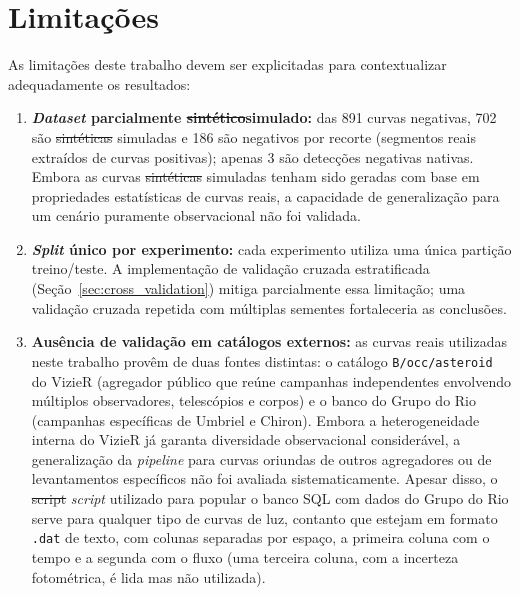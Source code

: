 \documentclass[msc]{on} %
\makeatletter
\providecommand{\DIFaddtex}[1]{{\protect\color{red}#1}} %
\providecommand{\DIFdeltex}[1]{{\protect\color{red}\sout{#1}}} %
\providecommand{\DIFaddbegin}{} %
\providecommand{\DIFaddend}{} %
\providecommand{\DIFdelbegin}{} %
\providecommand{\DIFdelend}{} %
\providecommand{\DIFadd}[1]{\texorpdfstring{\DIFaddtex{#1}}{#1}} %
\providecommand{\DIFdel}[1]{\texorpdfstring{\DIFdeltex{#1}}{}} %
\let\sout@orig\sout %
\renewcommand{\sout}[1]{\ifmmode\text{\sout@orig{\ensuremath{#1}}}\else\sout@orig{#1}\fi} %
\makeatother
\begin{document}
\section{Limitações}

As limitações deste trabalho devem ser explicitadas para contextualizar adequadamente os resultados:

\begin{enumerate}
	\item \textbf{\textit{Dataset} parcialmente \DIFdelbegin \DIFdel{sintético}\DIFdelend \DIFaddbegin \DIFadd{simulado}\DIFaddend :} das 891 curvas negativas, 702 são \DIFdelbegin \DIFdel{sintéticas }\DIFdelend \DIFaddbegin \DIFadd{simuladas }\DIFaddend e 186 são negativos por recorte (segmentos reais extraídos de curvas positivas); apenas 3 são detecções negativas nativas. Embora as curvas \DIFdelbegin \DIFdel{sintéticas }\DIFdelend \DIFaddbegin \DIFadd{simuladas }\DIFaddend tenham sido geradas com base em propriedades estatísticas de curvas reais, a capacidade de generalização para um cenário puramente observacional não foi validada.

	\item \textbf{\textit{Split} único por experimento:} cada experimento utiliza uma única partição treino/teste. A implementação de validação cruzada estratificada (Seção~\ref{sec:cross_validation}) mitiga parcialmente essa limitação; uma validação cruzada repetida com múltiplas sementes fortaleceria as conclusões.

	\item \textbf{Ausência de validação em catálogos externos:} as curvas reais utilizadas neste trabalho provêm de duas fontes distintas: o catálogo \texttt{B/occ/asteroid} do VizieR (agregador público que reúne campanhas independentes envolvendo múltiplos observadores, telescópios e corpos) e o banco do Grupo do Rio (campanhas específicas de Umbriel e Chiron). Embora a heterogeneidade interna do VizieR já garanta diversidade observacional considerável, a generalização da \textit{pipeline} para curvas oriundas de outros agregadores ou de levantamentos específicos não foi avaliada sistematicamente. Apesar disso, o \DIFdelbegin \DIFdel{script }\DIFdelend \DIFaddbegin \textit{\DIFadd{script}} \DIFaddend utilizado para popular o banco SQL com dados do Grupo do Rio serve para qualquer tipo de curvas de luz, contanto que estejam em formato \texttt{.dat} \DIFaddbegin \DIFadd{de texto, com colunas separadas por espaço, a primeira coluna com o tempo e a segunda com o fluxo (uma terceira coluna, com a incerteza fotométrica, é lida mas não utilizada)}\DIFaddend .


\end{enumerate}
\end{document}
